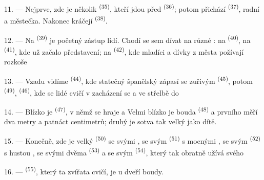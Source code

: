 11. --- Nejprve, zde je několik  \textsuperscript{(35)}, kteří jdou před
 \textsuperscript{(36)}; potom přichází 
\textsuperscript{(37)}, radní a  městečka. Nakonec kráčejí
 \textsuperscript{(38)}.

\VUsaut{5.0mm}
\VUsaut{3.6mm}

12. --- Na  \textsuperscript{(39)} je početný zástup lidí. Chodí
se sem dívat na různé : na  \textsuperscript{(40)}, na
 \textsuperscript{(41)}, kde už začalo představení; na 
\textsuperscript{(42)}, kde mladíci a dívky z města požívají rozkoše 

13. --- Vzadu vidíme  \textsuperscript{(44)}, kde statečný španělský
 zápasí se zuřivým  \textsuperscript{(45)}, potom
 \textsuperscript{(49)}, 
\textsuperscript{(46)}, kde se lidé cvičí v zacházení se  a ve
střelbě do 

14. --- Blízko je  \textsuperscript{(47)}, v němž se hraje
 a  Velmi blízko je bouda 
\textsuperscript{(48)} a   prvního měří dva metry a patnáct
centimetrů; druhý je sotva tak velký jako dítě.

15. --- Konečně, zde je velký  \textsuperscript{(50)} se svými
, se svým  \textsuperscript{(51)} s mocnými
, se svým  \textsuperscript{(52)} s hustou ,
se svými dvěma  \textsuperscript{(53)} a se svým 
\textsuperscript{(54)}, který tak obratně užívá svého 

16. ---  \textsuperscript{(55)}, který ta zvířata cvičí, je u dveří boudy.
